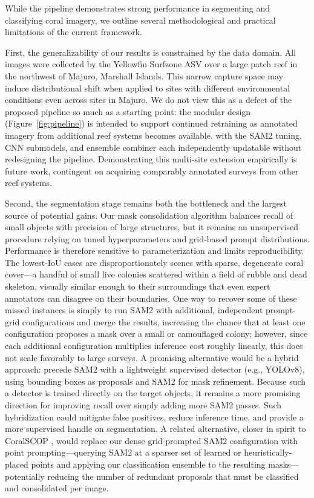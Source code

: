 \documentclass[11pt]{elsarticle}
\begin{document}
While the pipeline demonstrates strong performance in segmenting and classifying coral imagery, we outline several methodological and practical limitations of the current framework.

First, the generalizability of our results is constrained by the data domain. All images were collected by the Yellowfin Surfzone ASV over a large patch reef in the northwest of Majuro, Marshall Islands. This narrow capture space may induce distributional shift when applied to sites with different environmental conditions even across sites in Majuro. We do not view this as a defect of the proposed pipeline so much as a starting point: the modular design (Figure~\ref{fig:pipeline}) is intended to support continued retraining as annotated imagery from additional reef systems becomes available, with the SAM2 tuning, CNN submodels, and ensemble combiner each independently updatable without redesigning the pipeline. Demonstrating this multi-site extension empirically is future work, contingent on acquiring comparably annotated surveys from other reef systems.

Second, the segmentation stage remains both the bottleneck and the largest source of potential gains. Our mask consolidation algorithm balances recall of small objects with precision of large structures, but it remains an unsupervised procedure relying on tuned hyperparameters and grid-based prompt distributions. Performance is therefore sensitive to parameterization and limits reproducibility. The lowest-IoU cases are disproportionately scenes with sparse, degenerate coral cover---a handful of small live colonies scattered within a field of rubble and dead skeleton, visually similar enough to their surroundings that even expert annotators can disagree on their boundaries. One way to recover some of these missed instances is simply to run SAM2 with additional, independent prompt-grid configurations and merge the results, increasing the chance that at least one configuration proposes a mask over a small or camouflaged colony; however, since each additional configuration multiplies inference cost roughly linearly, this does not scale favorably to large surveys. A promising alternative would be a hybrid approach: precede SAM2 with a lightweight supervised detector (e.g., YOLOv8), using bounding boxes as proposals and SAM2 for mask refinement. Because such a detector is trained directly on the target objects, it remains a more promising direction for improving recall over simply adding more SAM2 passes. Such hybridization could mitigate false positives, reduce inference time, and provide a more supervised handle on segmentation. A related alternative, closer in spirit to CoralSCOP \citep{zheng2024}, would replace our dense grid-prompted SAM2 configuration with point prompting---querying SAM2 at a sparser set of learned or heuristically-placed points and applying our classification ensemble to the resulting masks---potentially reducing the number of redundant proposals that must be classified and consolidated per image.
\end{document}
